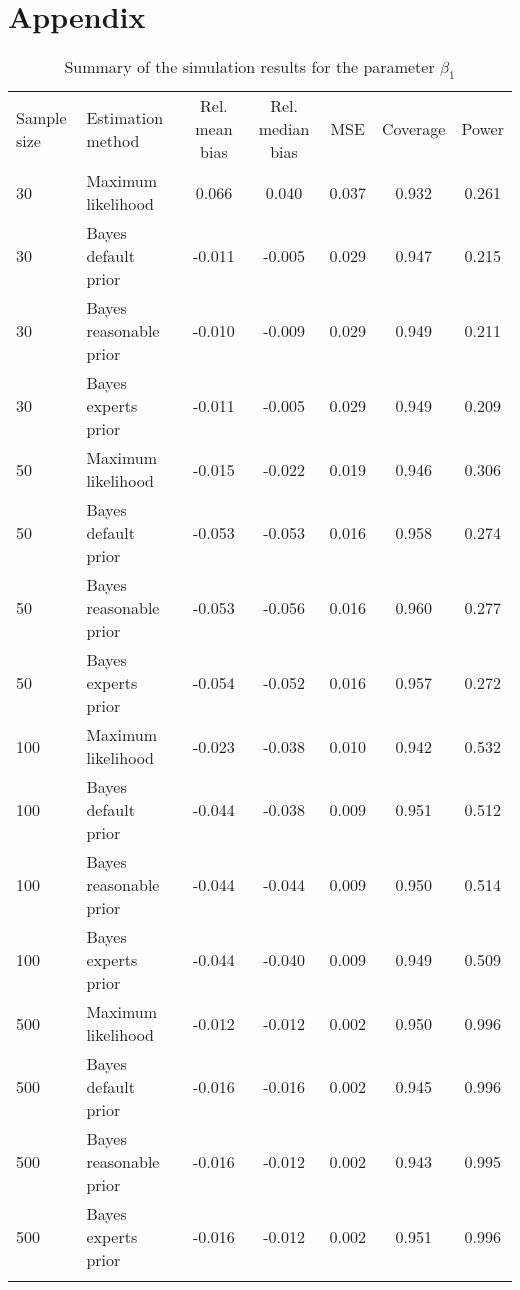 \documentclass[graybox]{svmult}
\begin{document}
\section*{Appendix}
\label{sec: apendix}


\begin{table}
\caption{Summary of the simulation results for the parameter $\beta_1$}
\label{tab:}
\begin{tabular}[t]{llccccc}
\hline\noalign{\smallskip}
Sample size & Estimation method & Rel. mean bias & Rel. median bias & MSE & Coverage & Power\\
\noalign{\smallskip}\svhline\noalign{\smallskip}
30 & Maximum likelihood & 0.066 & 0.040 & 0.037 & 0.932 & 0.261\\
30 & Bayes default prior & -0.011 & -0.005 & 0.029 & 0.947 & 0.215\\
30 & Bayes reasonable prior & -0.010 & -0.009 & 0.029 & 0.949 & 0.211\\
30 & Bayes experts prior & -0.011 & -0.005 & 0.029 & 0.949 & 0.209\\
\noalign{\smallskip}
50 & Maximum likelihood & -0.015 & -0.022 & 0.019 & 0.946 & 0.306\\
50 & Bayes default prior & -0.053 & -0.053 & 0.016 & 0.958 & 0.274\\
50 & Bayes reasonable prior & -0.053 & -0.056 & 0.016 & 0.960 & 0.277\\
50 & Bayes experts prior & -0.054 & -0.052 & 0.016 & 0.957 & 0.272\\
\noalign{\smallskip}
100 & Maximum likelihood & -0.023 & -0.038 & 0.010 & 0.942 & 0.532\\
100 & Bayes default prior & -0.044 & -0.038 & 0.009 & 0.951 & 0.512\\
100 & Bayes reasonable prior & -0.044 & -0.044 & 0.009 & 0.950 & 0.514\\
100 & Bayes experts prior & -0.044 & -0.040 & 0.009 & 0.949 & 0.509\\
\noalign{\smallskip}
500 & Maximum likelihood & -0.012 & -0.012 & 0.002 & 0.950 & 0.996\\
500 & Bayes default prior & -0.016 & -0.016 & 0.002 & 0.945 & 0.996\\
500 & Bayes reasonable prior & -0.016 & -0.012 & 0.002 & 0.943 & 0.995\\
500 & Bayes experts prior & -0.016 & -0.012 & 0.002 & 0.951 & 0.996\\
\noalign{\smallskip}\hline\noalign{\smallskip}
\end{tabular}
\end{table}
\end{document}
